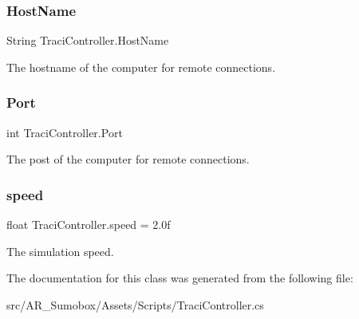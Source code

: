 \subsubsection{\texorpdfstring{HostName}{HostName}}
{\footnotesize\ttfamily String Traci\+Controller.\+Host\+Name}



The hostname of the computer for remote connections. 

\mbox{\label{class_traci_controller_a480600f51cbbd8506fbdca8fd3179cb3}} 
\subsubsection{\texorpdfstring{Port}{Port}}
{\footnotesize\ttfamily int Traci\+Controller.\+Port}



The post of the computer for remote connections. 

\mbox{\label{class_traci_controller_abc82770640e1620b43607ad292e97f4e}} 
\subsubsection{\texorpdfstring{speed}{speed}}
{\footnotesize\ttfamily float Traci\+Controller.\+speed = 2.\+0f}



The simulation speed. 



The documentation for this class was generated from the following file\+:\begin{DoxyCompactItemize}
\item 
src/\+A\+R\+\_\+\+Sumobox/\+Assets/\+Scripts/Traci\+Controller.\+cs\end{DoxyCompactItemize}

